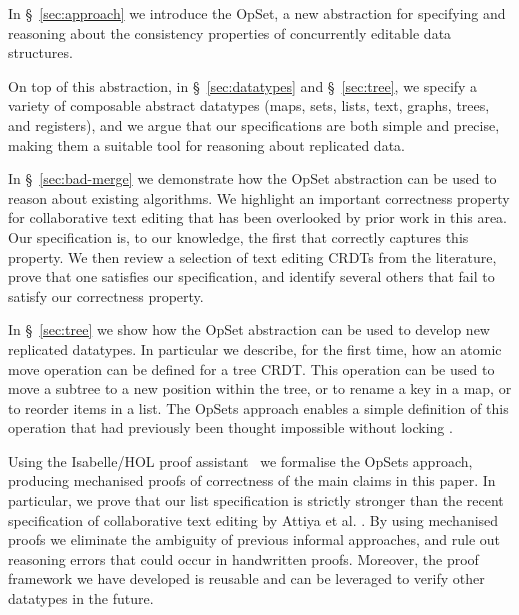 \documentclass[11pt]{article}
\begin{document}
\begin{itemize*}
\item In \S~\ref{sec:approach} we introduce the OpSet, a new abstraction for specifying and reasoning about the consistency properties of concurrently editable data structures.

\item On top of this abstraction, in \S~\ref{sec:datatypes} and \S~\ref{sec:tree}, we specify a variety of composable abstract datatypes (maps, sets, lists, text, graphs, trees, and registers), and we argue that our specifications are both simple and precise, making them a suitable tool for reasoning about replicated data.

\item In \S~\ref{sec:bad-merge} we demonstrate how the OpSet abstraction can be used to reason about existing algorithms. We highlight an important correctness property for collaborative text editing that has been overlooked by prior work in this area.
Our specification is, to our knowledge, the first that correctly captures this property.
We then review a selection of text editing CRDTs from the literature, prove that one satisfies our specification, and identify several others that fail to satisfy our correctness property.

\item In \S~\ref{sec:tree} we show how the OpSet abstraction can be used to develop new replicated datatypes. In particular we describe, for the first time, how an atomic move operation can be defined for a tree CRDT.
This operation can be used to move a subtree to a new position within the tree, or to rename a key in a map, or to reorder items in a list.
The OpSets approach enables a simple definition of this operation that had previously been thought impossible without locking \cite{Najafzadeh:2017vk}.

\item Using the Isabelle/HOL proof assistant~\cite{DBLP:conf/tphol/WenzelPN08} we formalise the OpSets approach, producing mechanised proofs of correctness of the main claims in this paper.
In particular, we prove that our list specification is strictly stronger than the recent specification of collaborative text editing by Attiya et al. \cite{Attiya:2016kh}.
By using mechanised proofs we eliminate the ambiguity of previous informal approaches, and rule out reasoning errors that could occur in handwritten proofs.
Moreover, the proof framework we have developed is reusable and can be leveraged to verify other datatypes in the future.
\end{itemize*}
\end{document}

